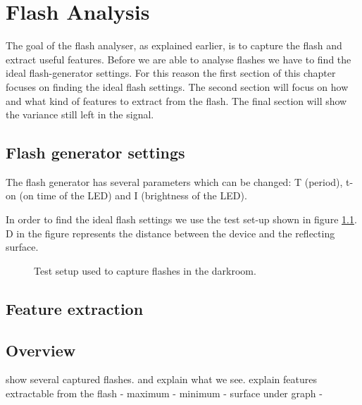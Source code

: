 \chapter{Flash Analysis}
\label{chp:Flash_Analysis}
The goal of the flash analyser, as explained earlier, is to capture the flash and extract useful features. 
Before we are able to analyse flashes we have to find the ideal flash-generator settings. For this reason the first section of this chapter focuses on finding the ideal flash settings. The second section will focus on how and what kind of features to extract from the flash. The final section will show the variance still left in the signal.



\section{Flash generator settings}
\label{sec:Flash_generator}
The flash generator has several parameters which can be changed: T (period), t-on (on time of the LED) and I (brightness of the LED).

In order to find the ideal flash settings we use the test set-up shown in figure \ref{fig:Flashcapturing}. D in the figure represents the distance between the device and the reflecting surface. 

\begin{figure}
	\centering     %
	\label{fig:Flashcapturing}
	\caption{Test setup used to capture flashes in the darkroom.}
\end{figure}



\section{Feature extraction}

\section{Overview}



show several captured flashes. and explain what we see.
explain features extractable from the flash
 - maximum
 - minimum
 - surface under graph
 - 

